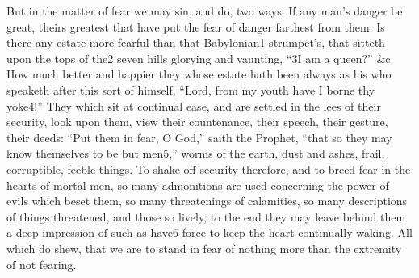 But in the matter of fear we may sin, and do, two ways. If any man’s danger be great, theirs greatest that have put the fear of danger farthest from them. Is there any estate more fearful than that Babylonian1 strumpet’s, that sitteth upon the tops of the2 seven hills glorying and vaunting, “3I am a queen?” &c. How much better and happier they whose estate hath been always as his who speaketh after this sort of himself, “Lord, from my youth have I borne thy yoke4!” They which sit at continual ease, and are settled in the lees of their security, look upon them, view their countenance, their speech, their gesture, their deeds: “Put them in fear, O God,” saith the Prophet, “that so they may know themselves to be but men5,” worms of the earth, dust and ashes, frail, corruptible, feeble things. To shake off security therefore, and to breed fear in the hearts of mortal men, so many admonitions are used concerning the power of evils which beset them, so many threatenings of calamities, so many descriptions of things threatened, and those so lively, to the end they may leave behind them a deep impression of such as have6 force to keep the heart continually waking. All which do shew, that we are to stand in fear of nothing more than the extremity of not fearing.

